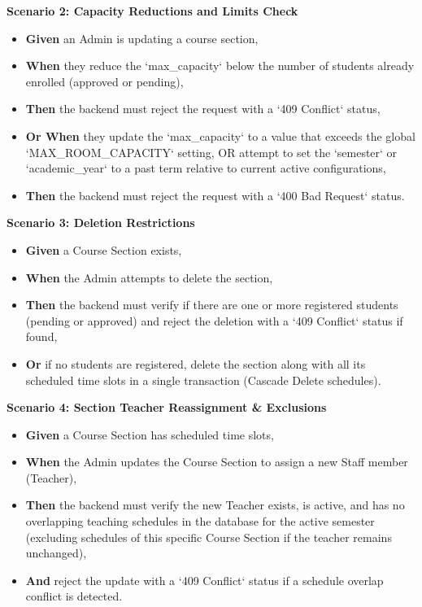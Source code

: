 \noindent\textbf{Scenario 2: Capacity Reductions and Limits Check}\\
\begin{itemize}
  \item \textbf{Given} an Admin is updating a course section,
  \item \textbf{When} they reduce the `max\_capacity` below the number of students already enrolled (approved or pending),
  \item \textbf{Then} the backend must reject the request with a `409 Conflict` status,
  \item \textbf{Or When} they update the `max\_capacity` to a value that exceeds the global `MAX\_ROOM\_CAPACITY` setting, OR attempt to set the `semester` or `academic\_year` to a past term relative to current active configurations,
  \item \textbf{Then} the backend must reject the request with a `400 Bad Request` status.
\end{itemize}


\noindent\textbf{Scenario 3: Deletion Restrictions}\\
\begin{itemize}
  \item \textbf{Given} a Course Section exists,
  \item \textbf{When} the Admin attempts to delete the section,
  \item \textbf{Then} the backend must verify if there are one or more registered students (pending or approved) and reject the deletion with a `409 Conflict` status if found,
  \item \textbf{Or} if no students are registered, delete the section along with all its scheduled time slots in a single transaction (Cascade Delete schedules).
\end{itemize}


\noindent\textbf{Scenario 4: Section Teacher Reassignment \& Exclusions}\\
\begin{itemize}
  \item \textbf{Given} a Course Section has scheduled time slots,
  \item \textbf{When} the Admin updates the Course Section to assign a new Staff member (Teacher),
  \item \textbf{Then} the backend must verify the new Teacher exists, is active, and has no overlapping teaching schedules in the database for the active semester (excluding schedules of this specific Course Section if the teacher remains unchanged),
  \item \textbf{And} reject the update with a `409 Conflict` status if a schedule overlap conflict is detected.
\end{itemize}

